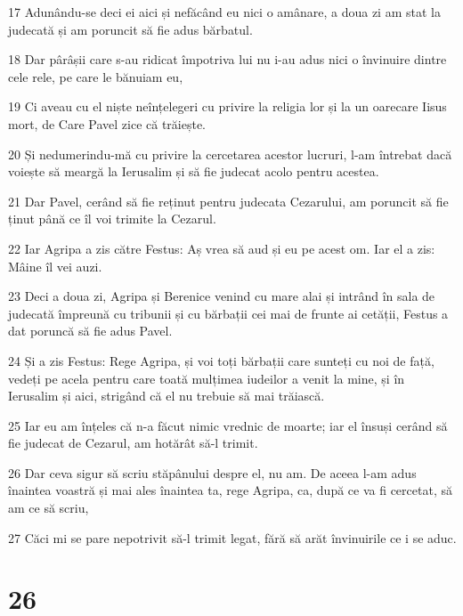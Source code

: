 \par 17 Adunându-se deci ei aici și nefăcând eu nici o amânare, a doua zi am stat la judecată și am poruncit să fie adus bărbatul.
\par 18 Dar pârâșii care s-au ridicat împotriva lui nu i-au adus nici o învinuire dintre cele rele, pe care le bănuiam eu,
\par 19 Ci aveau cu el niște neînțelegeri cu privire la religia lor și la un oarecare Iisus mort, de Care Pavel zice că trăiește.
\par 20 Și nedumerindu-mă cu privire la cercetarea acestor lucruri, l-am întrebat dacă voiește să meargă la Ierusalim și să fie judecat acolo pentru acestea.
\par 21 Dar Pavel, cerând să fie reținut pentru judecata Cezarului, am poruncit să fie ținut până ce îl voi trimite la Cezarul.
\par 22 Iar Agripa a zis către Festus: Aș vrea să aud și eu pe acest om. Iar el a zis: Mâine îl vei auzi.
\par 23 Deci a doua zi, Agripa și Berenice venind cu mare alai și intrând în sala de judecată împreună cu tribunii și cu bărbații cei mai de frunte ai cetății, Festus a dat poruncă să fie adus Pavel.
\par 24 Și a zis Festus: Rege Agripa, și voi toți bărbații care sunteți cu noi de față, vedeți pe acela pentru care toată mulțimea iudeilor a venit la mine, și în Ierusalim și aici, strigând că el nu trebuie să mai trăiască.
\par 25 Iar eu am înțeles că n-a făcut nimic vrednic de moarte; iar el însuși cerând să fie judecat de Cezarul, am hotărât să-l trimit.
\par 26 Dar ceva sigur să scriu stăpânului despre el, nu am. De aceea l-am adus înaintea voastră și mai ales înaintea ta, rege Agripa, ca, după ce va fi cercetat, să am ce să scriu,
\par 27 Căci mi se pare nepotrivit să-l trimit legat, fără să arăt învinuirile ce i se aduc.

\chapter{26}

